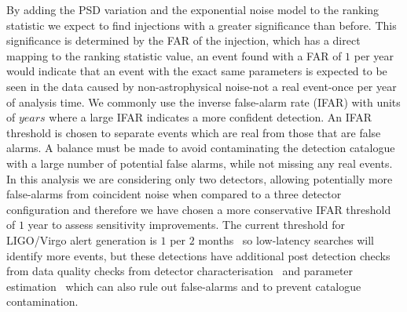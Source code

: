 By adding the PSD variation and the exponential noise model to the ranking statistic we expect to find \gwadj injections with a greater significance than before. This significance is determined by the FAR of the injection, which has a direct mapping to the ranking statistic value, an event found with a FAR of $1$ per year would indicate that an event with the exact same parameters is expected to be seen in the data caused by non-astrophysical noise-not a real event-once per year of analysis time. We commonly use the inverse false-alarm rate (IFAR) with units of $years$ where a large IFAR indicates a more confident detection. An IFAR threshold is chosen to separate events which are real from those that are false alarms. A balance must be made to avoid contaminating the detection catalogue with a large number of potential false alarms, while not missing any real events. In this analysis we are considering only two detectors, allowing potentially more false-alarms from coincident noise when compared to a three detector configuration and therefore we have chosen a more conservative IFAR threshold of $1$ year to assess sensitivity improvements. The current threshold for LIGO/Virgo alert generation is $1$ per $2$ months~\cite{PyCBC_Live:2018} so low-latency \gwadj searches will identify more \gwadj events, but these detections have additional post detection checks from data quality checks from detector characterisation~\cite{O2O3_DetChar:2021} and parameter estimation~\cite{gwtc3:2023} which can also rule out false-alarms and to prevent catalogue contamination.


